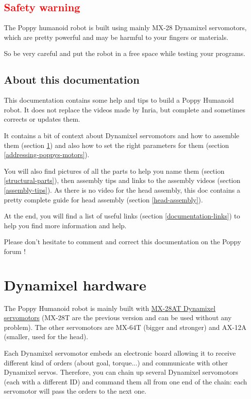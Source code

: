 \documentclass{article}
\begin{document}
\subsection{\textcolor{red}{Safety warning}}

The Poppy humanoid robot is built using mainly MX-28 Dynamixel servomotors, which are pretty powerful and may be harmful to your fingers or materials.

So be very careful and put the robot in a free space while testing your programs.

\subsection{About this documentation}

This documentation contains some help and tips to build a Poppy Humanoid robot. It does not replace the videos made by Inria, but complete and sometimes corrects or updates them.

It contains a bit of context about Dynamixel servomotors and how to assemble them (section \ref{dynamixel-hardware}) and also how to set the right parameters for them (section \ref{addressing-poppys-motors}).

You will also find pictures of all the parts to help you name them (section \ref{structural-parts}), then assembly tips and links to the assembly videos (section \ref{assembly-tips}). As there is no video for the head assembly, this doc contains a pretty complete guide for head assembly (section \ref{head-assembly}).

At the end, you will find a list of useful links (section \ref{documentation-links}) to help you find more information and help.

Please don't hesitate to comment and correct this documentation on the Poppy forum !

\section{Dynamixel hardware}
\label{dynamixel-hardware}

The Poppy Humanoid robot is mainly built with \href{http://www.generationrobots.com/en/401858-servomotor-dynamixel-mx-28at.html}{MX-28AT Dynamixel servomotors} (MX-28T are the previous version and can be used without any problem). The other servomotors are MX-64T (bigger and stronger) and AX-12A (smaller, used for the head).

Each Dynamixel servomotor embeds an electronic board allowing it to receive different kind of orders (about goal, torque...) and communicate with other Dynamixel servos. Therefore, you can chain up several Dynamixel servomotors (each with a different ID) and command them all from one end of the chain: each servomotor will pass the orders to the next one. 
\end{document}
